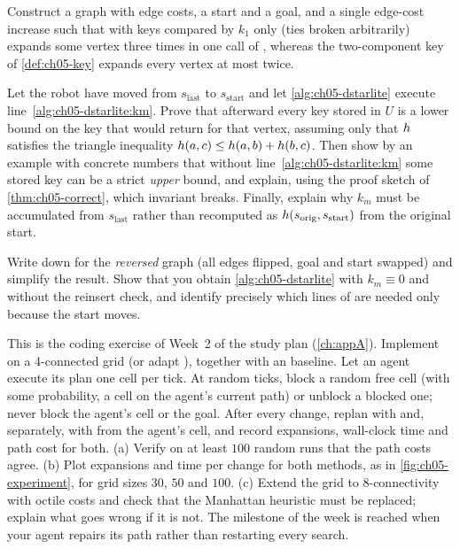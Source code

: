 \begin{exercise}[\difficulty{2}]
\label{exr:ch05-secondkey}
Construct a graph with edge costs, a start and a goal, and a single edge-cost increase
such that \lpastar with keys compared by $k_1$ only (ties broken arbitrarily) expands
some vertex three times in one call of \LpaComputeShortestPath, whereas the
two-component key of \cref{def:ch05-key} expands every vertex at most twice.
\end{exercise}

\begin{exercise}
\label{exr:ch05-kmproof}
Let the robot have moved from $s_{\mathrm{last}}$ to $s_{\mathrm{start}}$ and let
\cref{alg:ch05-dstarlite} execute line~\ref{alg:ch05-dstarlite:km}. Prove that
afterward every key stored in $U$ is a lower bound on the key that \DslCalculateKey
would return for that vertex, assuming only that $h$ satisfies the triangle
inequality $h(a,c)\le h(a,b)+h(b,c)$. Then show by an example with
concrete numbers that without line~\ref{alg:ch05-dstarlite:km} some stored key can be a
strict \emph{upper} bound, and explain, using the proof sketch of
\cref{thm:ch05-correct}, which invariant breaks. Finally, explain why $k_m$ must be
accumulated from $s_{\mathrm{last}}$ rather than recomputed as
$h(s_{\mathrm{orig}}, s_{\mathrm{start}})$ from the original start.
\end{exercise}

\begin{exercise}[\difficulty{2}]
\label{exr:ch05-directions}
Write down \lpastar for the \emph{reversed} graph (all edges flipped, goal and start
swapped) and simplify the result. Show that you obtain \cref{alg:ch05-dstarlite} with
$k_m \equiv 0$ and without the reinsert check, and identify precisely which lines of
\DslMain are needed only because the start moves.
\end{exercise}

\begin{exercise}
\label{exr:ch05-coding}
This is the coding exercise of Week~2 of the study plan (\cref{ch:appA}). Implement
\dstarlite on a 4-connected grid (or adapt ), together
with an \astar baseline. Let an agent execute its plan one cell per tick. At random
ticks, block a random free cell (with some probability, a cell on the agent's current
path) or unblock a blocked one; never block the agent's cell or the goal. After every
change, replan with \dstarlite and, separately, with \astar from the agent's cell, and
record expansions, wall-clock time and path cost for both. (a) Verify on at least $100$
random runs that the path costs agree. (b) Plot expansions and time per change for
both methods, as in \cref{fig:ch05-experiment}, for grid sizes $30$, $50$ and $100$.
(c) Extend the grid to 8-connectivity with octile costs and check that the Manhattan
heuristic must be replaced; explain what goes wrong if it is not. The milestone of the
week is reached when your agent repairs its path rather than restarting every search.
\end{exercise}


